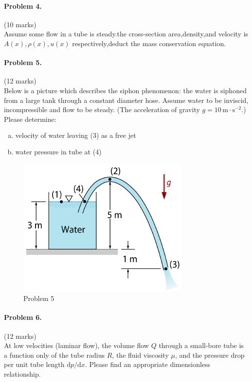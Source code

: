 \documentclass[12pt]{article}
\begin{document}
\paragraph{Problem 4.}\hfill (10 marks)\\
	Assume some flow in a tube is steady.the cross-section area,density,and velocity is $A(x),\rho(x),u(x)$ respectively,deduct the mass conservation equation.


\paragraph{Problem 5.}\hfill (12 marks)\\
Below is a picture which describes the siphon phenomenon: the water is siphoned from a large tank through a constant diameter hose. Assume water to be inviscid, incompressible and flow to be steady. (The acceleration of gravity $g=\mathrm{10 \, m\cdot s^{-2}}$.) Please determine:
\begin{enumerate}[(a)]
	\item
	velocity of water leaving (3) as a free jet
	\item
	water pressure in tube at (4)
\end{enumerate}
\begin{figure}[h]
	\centering
	\includegraphics[width=0.53\linewidth]{"figs/problem 5"}
	\caption{Problem 5}
	\label{fig:problem-5}
\end{figure}




\paragraph{Problem 6.}\hfill (12 marks)\\
At low velocities (laminar flow), the volume flow $Q$ through a small-bore tube is a function only of the tube radius $R$, the fluid viscosity $\mu$, and the pressure drop per unit tube length $\mathrm{d}p/\mathrm{d}x$. Please find an appropriate dimensionless relationship.
\end{document}
